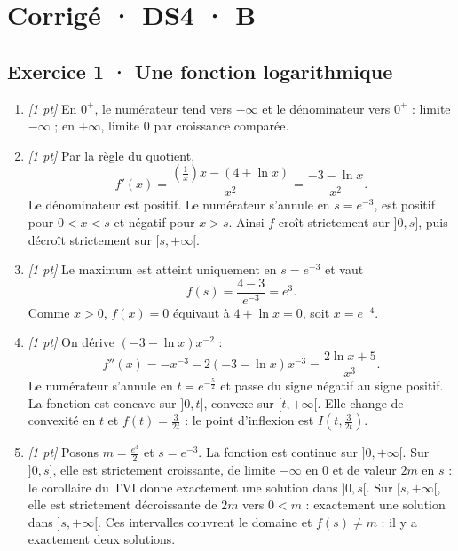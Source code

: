 \ifmxteacher\mxnewpage

\section*{Corrigé · DS4 · B}\label{cor:6-4}

\subsection*{Exercice 1 · Une fonction logarithmique}\begin{enumerate}

\item \textit{[1 pt]} En $0^+$, le numérateur tend vers $-\infty$ et le dénominateur vers $0^+$ : limite $-\infty$ ; en $+\infty$, limite $0$ par croissance comparée.

\item \textit{[1 pt]} Par la règle du quotient,
\[f'(x)=\frac{(\frac{1}{x})x-(4+\ln x)}{x^2}=\frac{-3-\ln x}{x^2}.\]
Le dénominateur est positif. Le numérateur s'annule en $s=e^{-3}$, est positif pour $0<x<s$ et négatif pour $x>s$. Ainsi $f$ croît strictement sur $]0,s]$, puis décroît strictement sur $[s,+\infty[$.

\item \textit{[1 pt]} Le maximum est atteint uniquement en $s=e^{-3}$ et vaut
\[f(s)=\frac{4- 3}{e^{-3}}=e^{3}.\]
Comme $x>0$, $f(x)=0$ équivaut à $4+\ln x=0$, soit $x=e^{-4}$.

\item \textit{[1 pt]} On dérive $(-3-\ln x)x^{-2}$ :
\[f''(x)=-x^{-3}-2(-3-\ln x)x^{-3}=\frac{2\ln x+5}{x^3}.\]
Le numérateur s'annule en $t=e^{-\frac{5}{2}}$ et passe du signe négatif au signe positif. La fonction est concave sur $]0,t]$, convexe sur $[t,+\infty[$. Elle change de convexité en $t$ et $f(t)=\frac{3}{2t}$ : le point d'inflexion est $I(t,\frac{3}{2t})$.

\item \textit{[1 pt]} Posons $m=\frac{e^{3}}{2}$ et $s=e^{-3}$. La fonction est continue sur $]0,+\infty[$. Sur $]0,s]$, elle est strictement croissante, de limite $-\infty$ en $0$ et de valeur $2m$ en $s$ : le corollaire du TVI donne exactement une solution dans $]0,s[$. Sur $[s,+\infty[$, elle est strictement décroissante de $2m$ vers $0<m$ : exactement une solution dans $]s,+\infty[$. Ces intervalles couvrent le domaine et $f(s)\ne m$ : il y a exactement deux solutions.

\end{enumerate}


